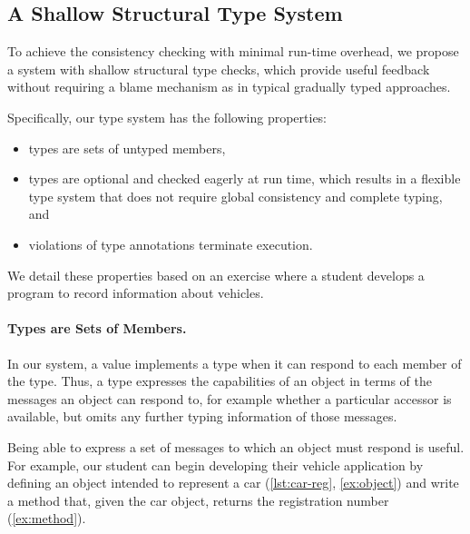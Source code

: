 \subsection{A Shallow Structural Type System}

To achieve the consistency checking with minimal run-time overhead,
we propose a system with shallow structural type checks,
which provide useful feedback without requiring a blame mechanism
as in typical gradually typed approaches.


Specifically, our type system has the following properties:

\begin{itemize}
  \item types are sets of untyped members,
  \item types are optional and checked eagerly at run time,
        which results in a flexible type system that does not require global
        consistency and complete typing, and
  \item violations of type annotations terminate execution.
\end{itemize}


We detail these properties
based on an exercise where a student develops
a program to record information about vehicles.

\paragraph{Types are Sets of Members.}

In our system, a value implements a type when it
can respond to each member of the type.
Thus, a type expresses the capabilities
of an object in terms of the messages an object
can respond to, for example whether a particular accessor is
available, but omits any further typing information of those messages.

Being able to express a set of messages to which an object
must respond is useful. For example, our student can begin
developing their vehicle application
by defining an object
intended to represent a car (\cref{lst:car-reg}, \cref{ex:object}) and write a method that, 
given the car object,
returns the registration number (\cref{ex:method}).


